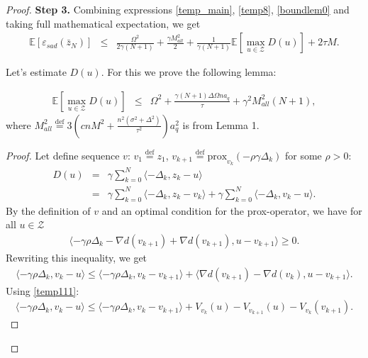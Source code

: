 \documentclass[runningheads]{llncs}
\def\eqdef{\overset{\text{def}}{=}}
\begin{document}
\begin{proof}
\textbf{Step 3.} Combining expressions \eqref{temp_main}, \eqref{temp8}, \eqref{boundlem0} and taking full mathematical expectation, we get
\begin{eqnarray}
    \label{t4t}
    \mathbb{E}\left[\varepsilon_{sad}(\bar z_N)\right] 
    &\leq& \frac{\Omega^2}{2\gamma(N+1)} + \frac{\gamma M^2_{all}}{2} + \frac{1}{\gamma(N+1)}\mathbb{E}\left[\max_{u \in \mathcal{Z}} D(u)\right]  + 2\tau M .
\end{eqnarray}

Let's estimate $D(u)$. For this we prove the following lemma:
\begin{lemma}\label{lemma3}
\begin{eqnarray}
    \label{19}
    \mathbb{E}\left[\max_{u \in \mathcal{Z}} D(u)\right] &\leq& 
    \Omega^2 + \frac{\gamma (N + 1)\Delta \Omega n a_q}{\tau} + \gamma^2 M^2_{all} (N + 1), 
\end{eqnarray}
where $M^2_{all} \eqdef
3\left(cn M^2 + \frac{n^2(\sigma^2 + \Delta^2)}{\tau^2}\right)a^2_q$ is from Lemma 1.
\end{lemma}
\begin{proof} Let define sequence $v$: $v_1 \eqdef z_1$, $v_{k+1} \eqdef \text{prox}_{v_k} (-\rho \gamma \Delta_k)$ for some $\rho > 0$:
\begin{eqnarray}
\label{temp177}
    D(u) &=& \gamma\sum\limits_{k=0}^N  \langle -\Delta_k, z_k - u \rangle \nonumber\\
    &=& \gamma\sum\limits_{k=0}^N  \langle -\Delta_k, z_k - v_k \rangle + \gamma
    \sum\limits_{k=0}^N  \langle -\Delta_k,  v_k - u \rangle . 
\end{eqnarray}
By the definition of $v$ and an optimal condition for the prox-operator, we have for all $u \in \mathcal{Z}$
\begin{eqnarray*}
    \langle -\gamma \rho\Delta_k - \nabla d(v_{k+1})  + \nabla d(v_{k+1}), u - v_{k+1} \rangle \geq 0.
\end{eqnarray*}
Rewriting this inequality, we get
\begin{eqnarray*}
    \langle -\gamma \rho\Delta_k, v_k  - u \rangle \leq \langle -\gamma \rho\Delta_k, v_k - v_{k+1} \rangle  + \langle \nabla d (v_{k+1}) - \nabla d (v_k), u - v_{k+1} \rangle.
\end{eqnarray*}
Using \eqref{temp111}:
\begin{eqnarray*}
    \langle -\gamma \rho\Delta_k, v_k  - u \rangle \leq \langle -\gamma \rho\Delta_k, v_k - v_{k+1} \rangle + V_{v_k}(u) -  V_{v_{k+1}}(u) - V_{v_k}(v_{k+1}).

\end{eqnarray*}
\end{proof}
\end{proof}
\end{document}
